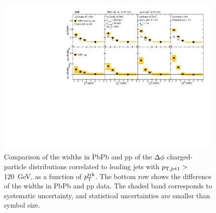 \begin{figure}[hbtp]
\begin{center}
\includegraphics[width=0.99\textwidth]{figures/Results/Width_Phi_Leading.pdf}
\caption[Leading jet $\Delta\phi$ correlation widths as a function of $p_{\rm T}^{\rm trk}$ at 2.76 TeV]{Comparison of the widths in PbPb and pp of the $\protect\Delta\phi$ charged-particle distributions correlated to leading jets with $p_{\rm T, jet1}>$ 120~GeV, as a function of $p_{\rm T}^{\rm trk}$.  The bottom row shows the difference of the widths in PbPb and pp data.  The shaded band corresponds to systematic uncertainty, and statistical uncertainties are smaller than symbol size.}
\label{fig:Width_phi_lead}
\end{center}
\end{figure}

